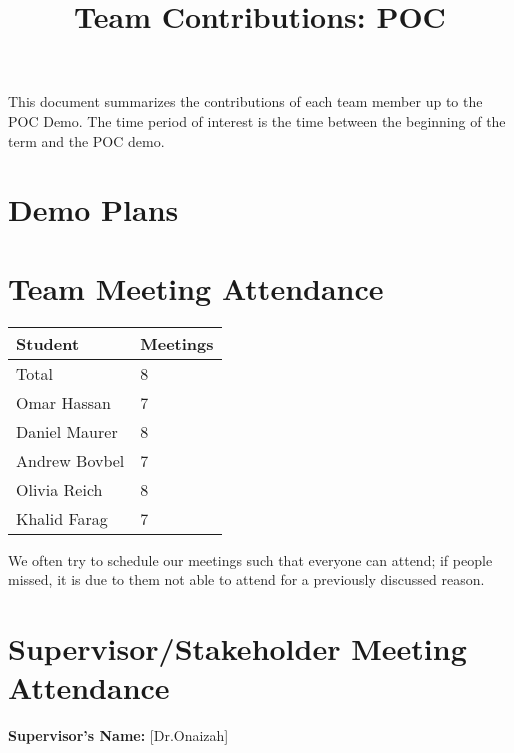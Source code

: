 \documentclass{article}
\title{Team Contributions: POC\\\progname}
\author{\authname}
\date{}
\begin{document}
\maketitle

This document summarizes the contributions of each team member up to the POC
Demo.  The time period of interest is the time between the beginning of the term
and the POC demo.

\section{Demo Plans}
\iffalse
\wss{What will you be demonstrating}
\fi

\section{Team Meeting Attendance}
\iffalse
\wss{For each team member how many team meetings have they attended over the
time period of interest.  This number should be determined from the meeting
issues in the team's repo.  The first entry in the table should be the total
number of team meetings held by the team.}
\fi
\begin{table}[H]
\centering
\begin{tabular}{ll}
\toprule
\textbf{Student} & \textbf{Meetings}\\
\midrule
Total & 8\\
Omar Hassan & 7\\
Daniel Maurer & 8\\
Andrew Bovbel & 7\\
Olivia Reich & 8\\
Khalid Farag & 7\\
\bottomrule
\end{tabular}
\end{table}

We often try to schedule our meetings such that everyone can attend; if people missed, it is due to them not
able to attend for a previously discussed reason.

\section{Supervisor/Stakeholder Meeting Attendance}
\iffalse
\wss{For each team member how many supervisor/stakeholder team meetings have
they attended over the time period of interest.  This number should be determined
from the supervisor meeting issues in the team's repo.  The first entry in the
table should be the total number of supervisor and team meetings held by the
team.  If there is no supervisor, there will usually be meetings with
stakeholders (potential users) that can serve a similar purpose.}
\fi
\noindent \textbf{Supervisor's Name: } [Dr.Onaizah]
\end{document}
